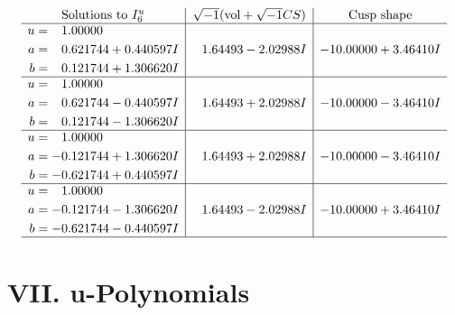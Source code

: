 \documentclass[1p]{elsarticle_modified}
\theoremstyle{definition}
\newcommand{\I}{\sqrt{-1}}
\begin{document}
$$\begin{array}{c|c|c}  
\text{Solutions to }I^u_{6}& \I (\text{vol} + \sqrt{-1}CS) & \text{Cusp shape}\\
 \hline 
\begin{aligned}
u &= \phantom{-}1.00000\phantom{ +0.000000I} \\
a &= \phantom{-}0.621744 + 0.440597 I \\
b &= \phantom{-}0.121744 + 1.306620 I\end{aligned}
 & \phantom{-}1.64493 - 2.02988 I & -10.00000 + 3.46410 I \\ \hline\begin{aligned}
u &= \phantom{-}1.00000\phantom{ +0.000000I} \\
a &= \phantom{-}0.621744 - 0.440597 I \\
b &= \phantom{-}0.121744 - 1.306620 I\end{aligned}
 & \phantom{-}1.64493 + 2.02988 I & -10.00000 - 3.46410 I \\ \hline\begin{aligned}
u &= \phantom{-}1.00000\phantom{ +0.000000I} \\
a &= -0.121744 + 1.306620 I \\
b &= -0.621744 + 0.440597 I\end{aligned}
 & \phantom{-}1.64493 + 2.02988 I & -10.00000 - 3.46410 I \\ \hline\begin{aligned}
u &= \phantom{-}1.00000\phantom{ +0.000000I} \\
a &= -0.121744 - 1.306620 I \\
b &= -0.621744 - 0.440597 I\end{aligned}
 & \phantom{-}1.64493 - 2.02988 I & -10.00000 + 3.46410 I\\
 \hline 
 \end{array}$$\newpage
\newpage\renewcommand{\arraystretch}{1}
\centering \section*{ VII. u-Polynomials}
\end{document}
